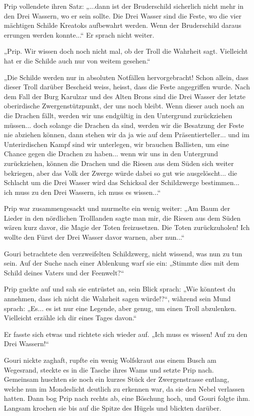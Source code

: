 Prip vollendete ihren Satz: „...dann ist der Bruderschild sicherlich nicht mehr in den Drei Wassern, wo er sein sollte. Die Drei Wasser sind die Feste, wo die vier mächtigen Schilde Kreatoks aufbewahrt werden. Wenn der Bruderschild daraus errungen werden konnte...“ Er sprach nicht weiter.

„Prip. Wir wissen doch noch nicht mal, ob der Troll die Wahrheit sagt. Vielleicht hat er die Schilde auch nur von weitem gesehen.“

„Die Schilde werden nur in absoluten Notfällen hervorgebracht! Schon allein, dass dieser Troll darüber Bescheid weiss, heisst, dass die Feste angegriffen wurde. Nach dem Fall der Burg Karulzar und des Alten Brons sind die Drei Wasser der letzte oberirdische Zwergenstützpunkt, der uns noch bleibt. Wenn dieser auch noch an die Drachen fällt, werden wir uns endgültig in den Untergrund zurückziehen müssen... doch solange die Drachen da sind, werden wir die Besatzung der Feste nie abziehen können, dann stehen wir da ja wie auf dem Präsentierteller... und im Unterirdischen Kampf sind wir unterlegen, wir brauchen Ballisten, um eine Chance gegen die Drachen zu haben... wenn wir uns in den Untergrund zurückziehen, können die Drachen und die Riesen aus dem Süden sich weiter bekriegen, aber das Volk der Zwerge würde dabei so gut wie ausgelöscht... die Schlacht um die Drei Wasser wird das Schicksal der Schildzwerge bestimmen... ich muss zu den Drei Wassern, ich muss es wissen...“

Prip war zusammengesackt und murmelte ein wenig weiter: „Am Baum der Lieder in den nördlichen Trolllanden sagte man mir, die Riesen aus dem Süden wären kurz davor, die Magie der Toten freizusetzen. Die Toten zurückzuholen! Ich wollte den Fürst der Drei Wasser davor warnen, aber nun...“

Gouri betrachtete den verzweifelten Schildzwerg, nicht wissend, was nun zu tun sein. Auf der Suche nach einer Ablenkung warf sie ein: „Stimmte dies mit dem Schild deines Vaters und der Feenwelt?“

Prip guckte auf und sah sie entrüstet an, sein Blick sprach: „Wie könntest du annehmen, dass ich nicht die Wahrheit sagen würde!?“, während sein Mund sprach: „Es... es ist nur eine Legende, aber genug, um einen Troll abzulenken. Vielleicht erzähle ich dir eines Tages davon.“

Er fasste sich etwas und richtete sich wieder auf. „Ich muss es wissen! Auf zu den Drei Wassern!“

Gouri nickte zaghaft, rupfte ein wenig Wolfskraut aus einem Busch am Wegesrand, steckte es in die Tasche ihres Wams und setzte Prip nach. Gemeinsam huschten sie noch ein kurzes Stück der Zwergenstrasse entlang, welche nun im Mondeslicht deutlich zu erkennen war, da sie den Nebel verlassen hatten. Dann bog Prip nach rechts ab, eine Böschung hoch, und Gouri folgte ihm. Langsam krochen sie bis auf die Spitze des Hügels und blickten darüber.

